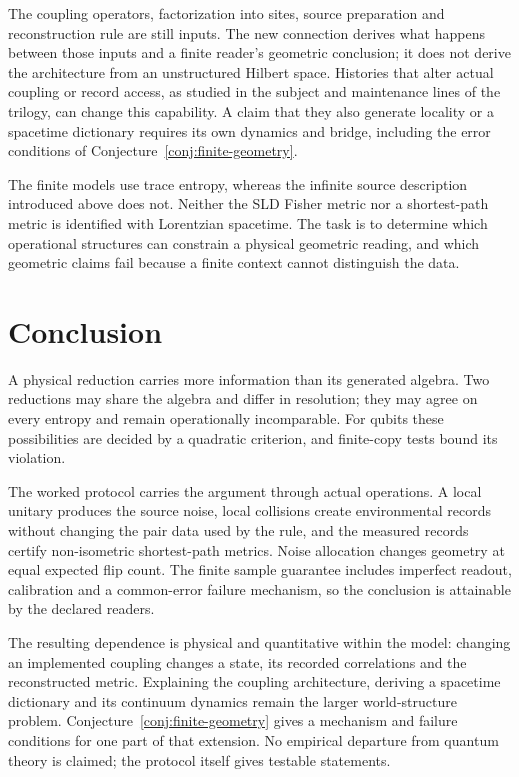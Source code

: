 \documentclass[12pt,a4paper]{article}
\begin{document}
The coupling operators, factorization into sites, source preparation
and reconstruction rule are still inputs. The new connection
derives what happens between those inputs and a finite reader's
geometric conclusion; it does not derive the architecture from an
unstructured Hilbert space. Histories that alter actual coupling or
record access, as studied in the subject and maintenance lines of
the trilogy, can change this capability. A claim that they also
generate locality or a spacetime dictionary requires its own
dynamics and bridge, including the error conditions of
Conjecture~\ref{conj:finite-geometry}.

The finite models use trace entropy, whereas the infinite source
description introduced above does not. Neither the SLD Fisher
metric nor a shortest-path metric is identified with Lorentzian
spacetime. The task is to determine which operational structures
can constrain a physical geometric reading, and which geometric
claims fail because a finite context cannot distinguish the data.

\section{Conclusion}
\label{sec:conclusion}

A physical reduction carries more information than its generated
algebra. Two reductions may share the algebra and differ in
resolution; they may agree on every entropy and remain
operationally incomparable. For qubits these possibilities are
decided by a quadratic criterion, and finite-copy tests bound its
violation.

The worked protocol carries the argument through actual operations.
A local unitary produces the source noise, local collisions create
environmental records without changing the pair data used by the
rule, and the measured records certify non-isometric shortest-path
metrics. Noise allocation changes geometry at equal expected flip
count. The finite sample guarantee includes imperfect readout,
calibration and a common-error failure mechanism, so the conclusion
is attainable by the declared readers.

The resulting dependence is physical and quantitative within the
model: changing an implemented coupling changes a state, its
recorded correlations and the reconstructed metric. Explaining the
coupling architecture, deriving a spacetime dictionary and its
continuum dynamics remain the larger world-structure problem.
Conjecture~\ref{conj:finite-geometry} gives a mechanism and failure
conditions for one part of that extension. No empirical departure
from quantum theory is claimed; the protocol itself gives
testable statements.
\end{document}
